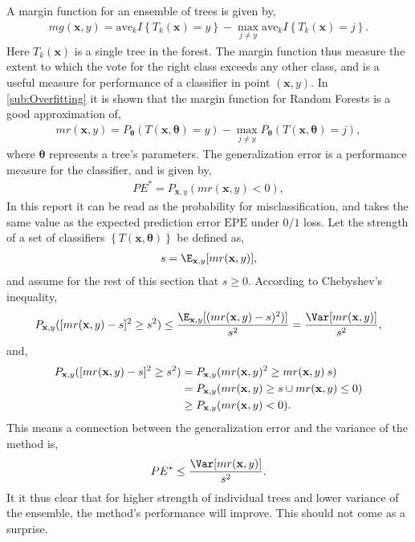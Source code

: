 A margin function for an ensemble of trees is given by,
\begin{align}
  mg(\mathbf{x}, y) = \mathrm{ave}_k I\left\{ T_k(\mathbf{x}) = y \right\} - 
  \max_{j \neq y} \mathrm{ave}_k I\left\{ T_k(\mathbf{x}) = j \right\}.
\end{align}
Here $T_k(\mathbf{x})$ is a single tree in the forest. 
The margin function thus measure the extent to which the vote for the right class exceeds any other class, and is a useful measure for performance of a classifier in point $(\mathbf{x}, y)$.  
In \ref{sub:Overfitting} it is shown that the margin function for Random Forests is a good approximation of,
\begin{align}
  mr(\mathbf{x}, y) = P_{\bm \theta} (T(\mathbf{x}, \bm \theta) = y) - \max_{j \neq y} P_{\bm \theta}(T(\mathbf{x}, \bm \theta) = j), 
\end{align}
where $\bm \theta$ represents a tree's parameters.
The generalization error is a performance measure for the classifier, and is given by,
\begin{align}
  PE^* = P_{\mathbf{x}, y}(mr(\mathbf{x}, y) < 0),
\end{align}
In this report it can be read as the probability for misclassification, and takes the same value as the expected prediction error $\mathrm{EPE}$ under $0/1$ loss. 
Let the strength of a set of classifiers $\left\{ T(\mathbf{x}, \bm \theta) \right\}$ be defined as,
\begin{align}
  s = \E_{\mathbf{x}, y} [mr(\mathbf{x}, y)],
\end{align}
and assume for the rest of this section that $s \geq 0$.  
According to Chebyshev's inequality,
\begin{align}
  P_{\mathbf{x}, y} ([mr(\mathbf{x}, y)-s]^2 \geq s^2) \leq 
  \frac{\E_{\mathbf{x},y}[(mr(\mathbf{x}, y) - s)^2)]}{s^2} =
  \frac{\Var[mr(\mathbf{x}, y)]}{s^2},
\end{align}
and,
\begin{align}
  P_{\mathbf{x}, y} ([mr(\mathbf{x}, y)-s]^2 \geq s^2)
  &= P_{\mathbf{x}, y} (mr(\mathbf{x}, y)^2 \geq mr(\mathbf{x}, y)\: s) \notag \\
  &= P_{\mathbf{x}, y} (mr(\mathbf{x}, y) \geq s  \cup mr(\mathbf{x}, y) \leq 0) \notag \\
  & \geq P_{\mathbf{x}, y} (mr(\mathbf{x}, y) < 0).
\end{align}
This means a connection between the generalization error and the variance of the method is,
\begin{align}
  \label{eq:PEVar} 
  PE^* \leq  \frac{\Var[mr(\mathbf{x}, y)]}{s^2}.
\end{align}
It it thus clear that for higher strength of individual trees and lower variance of the ensemble, the method's performance will improve. This should not come as a surprise. 


